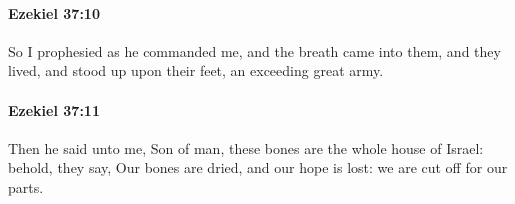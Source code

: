 		\paragraph{Ezekiel 37:10} %
			\label{EZEKIEL-37-10}

			So I prophesied as he commanded me, and the breath came into them, and they lived, and stood up upon their feet, an exceeding great army.


		\paragraph{Ezekiel 37:11} %
			\label{EZEKIEL-37-11}

			Then he said unto me, Son of man, these bones are the whole house of Israel: behold, they say, Our bones are dried, and our hope is lost: we are cut off for our parts.


